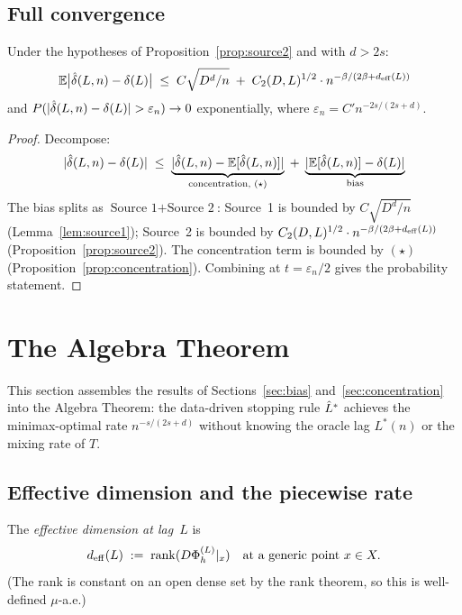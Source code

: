 \subsection{Full convergence}
\label{subsec:convergence}

\begin{theorem}
\label{thm:convergence}
Under the hypotheses of Proposition~\ref{prop:source2} and with $d > 2s$:
\[
  \mathbb{E}\bigl|\hat{\delta}(L,n) - \delta(L)\bigr|
  \;\leq\;
  C\sqrt{D^d/n}
  \;+\; C_2(D,L)^{1/2} \cdot n^{-\beta/(2\beta+d_{\mathrm{eff}}(L))}
\]
and $P(|\hat{\delta}(L,n) - \delta(L)| > \varepsilon_n) \to 0$ exponentially,
where $\varepsilon_n = C' n^{-2s/(2s+d)}$.
\end{theorem}

\begin{proof}
Decompose:
\[
  |\hat{\delta}(L,n) - \delta(L)|
  \;\leq\;
  \underbrace{|\hat{\delta}(L,n) - \mathbb{E}[\hat{\delta}(L,n)]|}_{\text{concentration, }(\star)}
  \;+\;
  \underbrace{|\mathbb{E}[\hat{\delta}(L,n)] - \delta(L)|}_{\text{bias}}
\]
The bias splits as $\text{Source~1} + \text{Source~2}$:
Source~1 is bounded by $C\sqrt{D^d/n}$ (Lemma~\ref{lem:source1});
Source~2 is bounded by $C_2(D,L)^{1/2} \cdot n^{-\beta/(2\beta+d_{\mathrm{eff}}(L))}$
(Proposition~\ref{prop:source2}).
The concentration term is bounded by $(\star)$ (Proposition~\ref{prop:concentration}).
Combining at $t = \varepsilon_n/2$ gives the probability statement.
\end{proof}

\section{The Algebra Theorem}
\label{sec:algebra}

This section assembles the results of Sections~\ref{sec:bias}
and~\ref{sec:concentration} into the Algebra Theorem: the data-driven stopping
rule $\hat{L}^*$ achieves the minimax-optimal rate $n^{-s/(2s+d)}$ without knowing
the oracle lag $L^*(n)$ or the mixing rate of $T$.

\subsection{Effective dimension and the piecewise rate}

\begin{definition}
\label{def:deff}
The \emph{effective dimension at lag~$L$} is
\[
  d_{\mathrm{eff}}(L) \;:=\; \operatorname{rank}(D\Phi_h^{(L)}|_x)
  \quad\text{at a generic point } x \in X.
\]
(The rank is constant on an open dense set by the rank theorem, so this is
well-defined $\mu$-a.e.)
\end{definition}


